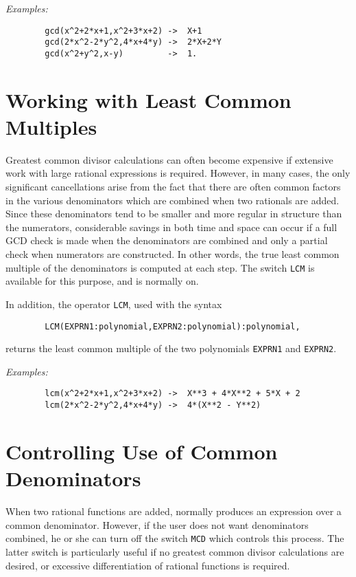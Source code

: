 {\it Examples:}
\begin{verbatim}
        gcd(x^2+2*x+1,x^2+3*x+2) ->  X+1
        gcd(2*x^2-2*y^2,4*x+4*y) ->  2*X+2*Y
        gcd(x^2+y^2,x-y)         ->  1.
\end{verbatim}

\section{Working with Least Common Multiples}
\hypertarget{switch:LCM}{}

Greatest common divisor calculations can often become expensive if
extensive work with large rational expressions is required. However, in
many cases, the only significant cancellations arise from the fact that
there are often common factors in the various denominators which are
combined when two rationals are added. Since these denominators tend to be
smaller and more regular in structure than the numerators, considerable
savings in both time and space can occur if a full GCD check is made when
the denominators are combined and only a partial check when numerators are
constructed. In other words, the true least common multiple of the
denominators is computed at each step. The switch {\tt LCM}
is available for this purpose, and is normally on.

\hypertarget{operator:LCM}{}
In addition, the operator {\tt LCM}, used with the syntax
\begin{verbatim}
        LCM(EXPRN1:polynomial,EXPRN2:polynomial):polynomial,
\end{verbatim}
returns the least common multiple of the two polynomials {\tt EXPRN1} and
{\tt EXPRN2}.

{\it Examples:}
\begin{verbatim}
        lcm(x^2+2*x+1,x^2+3*x+2) ->  X**3 + 4*X**2 + 5*X + 2
        lcm(2*x^2-2*y^2,4*x+4*y) ->  4*(X**2 - Y**2)
\end{verbatim}

\section{Controlling Use of Common Denominators}
\hypertarget{switch:MCD}{}

When two rational functions are added, {\REDUCE} normally produces an
expression over a common denominator. However, if the user does not want
denominators combined, he or she can turn off the switch {\tt MCD}
 which controls this process.  The latter switch is
particularly useful if no greatest common divisor calculations are
desired, or excessive differentiation of rational functions is required.

